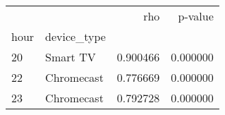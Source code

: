 \begin{tabular}{llrr}
\toprule
 &  & rho & p-value \\
hour & device_type &  &  \\
\midrule
20 & Smart TV & 0.900466 & 0.000000 \\
\cline{1-4}
22 & Chromecast & 0.776669 & 0.000000 \\
\cline{1-4}
23 & Chromecast & 0.792728 & 0.000000 \\
\cline{1-4}
\bottomrule
\end{tabular}
